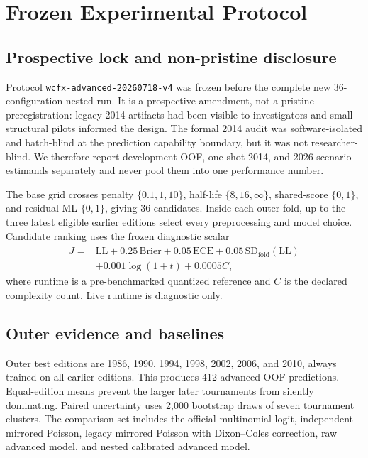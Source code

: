 \documentclass[11pt]{article}
\begin{document}
\section{Frozen Experimental Protocol}

\subsection{Prospective lock and non-pristine disclosure}

Protocol \texttt{wcfx-advanced-20260718-v4} was frozen before the complete new 36-configuration
nested run.  It is a prospective amendment, not a pristine preregistration: legacy 2014 artifacts
had been visible to investigators and small structural pilots informed the design.  The formal
2014 audit was software-isolated and batch-blind at the prediction capability boundary, but it was
not researcher-blind.  We therefore report development OOF, one-shot 2014, and 2026 scenario
estimands separately and never pool them into one performance number.

The base grid crosses penalty $\{0.1,1,10\}$, half-life $\{8,16,\infty\}$, shared-score
$\{0,1\}$, and residual-ML $\{0,1\}$, giving 36 candidates.  Inside each outer fold, up to the three
latest eligible earlier editions select every preprocessing and model choice.  Candidate ranking
uses the frozen diagnostic scalar
\begin{align}
 J={}&\overline{\mathrm{LL}}+0.25\,\overline{\mathrm{Brier}}
 +0.05\,\mathrm{ECE}+0.05\,\mathrm{SD}_{\mathrm{fold}}(\mathrm{LL}) \\
 &+0.001\log(1+t)+0.0005C,
\end{align}
where runtime is a pre-benchmarked quantized reference and $C$ is the declared complexity count.
Live runtime is diagnostic only.

\subsection{Outer evidence and baselines}

Outer test editions are 1986, 1990, 1994, 1998, 2002, 2006, and 2010, always trained on all
earlier editions.  This produces 412 advanced OOF predictions.  Equal-edition means prevent the
larger later tournaments from silently dominating.  Paired uncertainty uses 2,000 bootstrap draws
of seven tournament clusters.  The comparison set includes the official multinomial logit,
independent mirrored Poisson, legacy mirrored Poisson with Dixon--Coles correction, raw advanced
model, and nested calibrated advanced model.
\end{document}
